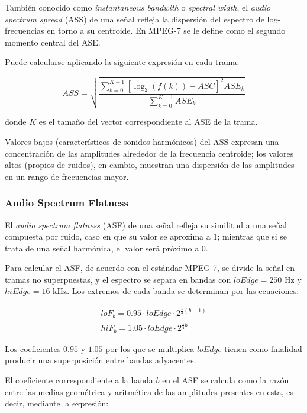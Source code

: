 También conocido como \textit{instantaneous bandwith} o \textit{spectral width}, el \textit{audio spectrum spread} (ASS) de una señal refleja la dispersión del espectro de log-frecuencias en torno a su centroide.
En MPEG-7 se le define como el segundo momento central del ASE\@.

Puede calcularse aplicando la siguiente expresión en cada trama:

\begin{equation}
    \label{eq:ASS}
    ASS = \sqrt{\frac{\sum_{k=0}^{K-1}{\left[ \log_{2}{(f(k))-ASC} \right]^2 ASE_k}}{\sum_{k=0}^{K-1}{ASE_k}}}
\end{equation}

\noindent
donde $K$ es el tamaño del vector correspondiente al ASE de la trama.

Valores bajos (característicos de sonidos harmónicos) del ASS expresan una concentración de las amplitudes alrededor de la frecuencia centroide;
los valores altos (propios de ruidos), en cambio, muestran una dispersión de las amplitudes en un rango de frecuencias mayor.

\subsubsection{Audio Spectrum Flatness}

El \textit{audio spectrum flatness} (ASF) de una señal refleja su similitud a una señal compuesta por ruido, caso en que su valor se aproxima a 1;
mientras que si se trata de una señal harmónica, el valor será próximo a 0.

Para calcular el ASF, de acuerdo con el estándar MPEG-7, se divide la señal en tramas no superpuestas, y el espectro se separa en bandas con $loEdge = 250$ Hz y $hiEdge = 16$ kHz.
Los extremos de cada banda se determinan por las ecuaciones:

\begin{gather*}
    loF_b = 0.95 \cdot loEdge \cdot 2^{\frac{1}{4}(b-1)} \\
    hiF_b = 1.05 \cdot loEdge \cdot 2^{\frac{1}{4}b}
\end{gather*}

Los coeficientes $0.95$ y $1.05$ por los que se multiplica $loEdge$ tienen como finalidad producir una superposición entre bandas adyacentes.

El coeficiente correspondiente a la banda $b$ en el ASF se calcula como la razón entre las medias geométrica y aritmética de las amplitudes presentes en esta, es decir, mediante la expresión:

